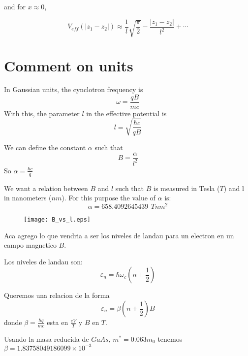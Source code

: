 \documentclass[a4paper,10pt]{article}
\begin{document}
\noindent and for $x\approx 0$,

\begin{equation}
V_{eff}(|z_1-z_2|)\approx \frac{1}{l}\sqrt{\frac{\pi}{2}} - \frac{|z_1-z_2|}{l^2}+ \cdots
\end{equation}

\section*{Comment on units}

In Gaussian units, the cynclotron frequency is
\begin{equation}
\omega = \frac{qB}{mc}
\end{equation}
\noindent
With this, the parameter $l$ in the effective potential is
\begin{equation}
l = \sqrt{\frac{\hbar c}{q B}}
\end{equation}

We can define the constant $\alpha$ such that
\begin{equation}
B = \frac{\alpha}{l^2}
\end{equation}
\noindent
So $\alpha = \frac{\hbar c}{q}$

We want a relation between $B$ and $l$ such that $B$ is measured in Tesla ($T$) and
l in nanometers ($nm$). For this purpose the value of $\alpha$ is:
\begin{equation}
\alpha = 658.4092645439 \, \ T nm^2
\end{equation}

\begin{figure}[h]
\begin{center}
 \texttt{[image: B\_vs\_l.eps]}
\end{center}
\end{figure}

Aca agrego lo que vendria a ser los niveles de landau para un electron en un campo magnetico $B$.

Los niveles de landau son:
\begin{equation}
\varepsilon_n = \hbar \omega_c \left(n + \frac{1}{2}\right)
\end{equation}

Queremos una relacion de la forma
\begin{equation}
\varepsilon_n = \beta \left(n+\frac{1}{2}\right) B
\end{equation}
\noindent
donde $\beta = \frac{\hbar q}{m c}$ esta en $\frac{eV}{T}$ y $B$ en $T$.

Usando la masa reducida de $GaAs$, $m^* = 0.063 m_0$ tenemos $\beta = 1.83758049186099\times 10^{-3}$
\end{document}
